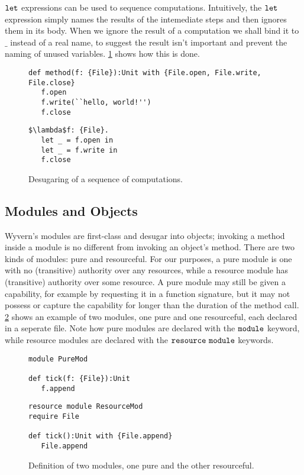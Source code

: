 $\mathtt{let}$ expressions can be used to sequence computations. Intuitively, the $\mathtt{let}$ expression simply names the results of the intemediate steps and then ignores them in its body. When we ignore the result of a computation we shall bind it to $\_$ instead of a real name, to suggest the result isn't important and prevent the naming of unused variables. \ref{fig:let_rules} shows how this is done.

\begin{figure}[h]

\begin{lstlisting}
def method(f: {File}):Unit with {File.open, File.write, File.close}
   f.open
   f.write(``hello, world!'')
   f.close
\end{lstlisting}

\begin{lstlisting}
$\lambda$f: {File}.
   let _ = f.open in
   let _ = f.write in
   f.close
\end{lstlisting}

\caption{Desugaring of a sequence of computations.}
\label{fig:let_rules}
\end{figure}

\subsection{Modules and Objects}

Wyvern's modules are first-class and desugar into objects; invoking a method inside a module is no different from invoking an object's method. There are two kinds of modules: pure and resourceful. For our purposes, a pure module is one with no (transitive) authority over any resources, while a resource module has (transitive) authority over some resource. A pure module may still be given a capability, for example by requesting it in a function signature, but it may not possess or capture the capability for longer than the duration of the method call. \ref{fig:wyv_modules} shows an example of two modules, one pure and one resourceful, each declared in a seperate file. Note how pure modules are declared with the $\mathtt{module}$ keyword, while resource modules are declared with the $\mathtt{resource~module}$ keywords.

\begin{figure}[h]

\begin{lstlisting}
module PureMod

def tick(f: {File}):Unit
   f.append

\end{lstlisting}

\begin{lstlisting}
resource module ResourceMod
require File

def tick():Unit with {File.append}
   File.append
\end{lstlisting}

\caption{Definition of two modules, one pure and the other resourceful.}
\label{fig:wyv_modules}
\end{figure}

